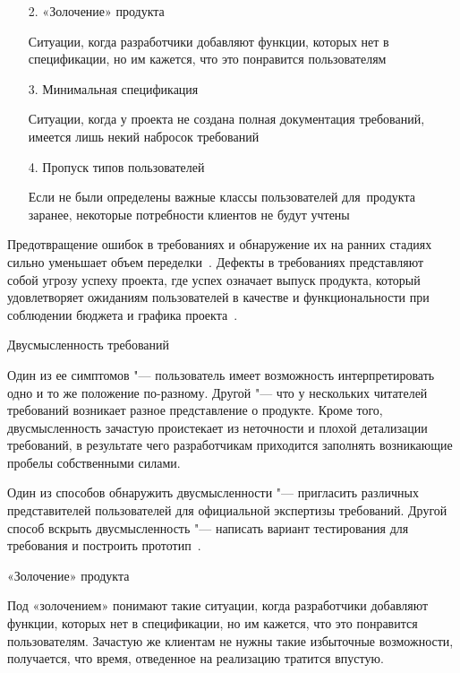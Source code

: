 \documentclass{../industrial-development}
\begin{document}
{\begin{frame}
\begin{itemize}
\item[2.] «Золочение» продукта

{\small Ситуации, когда разработчики добавляют функции, которых нет в спецификации, но им кажется, что это понравится пользователям}

\item[3.] Минимальная спецификация

{\small Ситуации, когда у проекта не создана полная документация требований, имеется лишь некий набросок требований}

\item[4.] Пропуск типов пользователей

{\small Если не были определены важные классы пользователей для~продукта заранее, некоторые потребности клиентов не будут учтены}

\end{itemize}
\end{frame}

\lecturenotes

Предотвращение ошибок в требованиях и обнаружение их на ранних стадиях сильно уменьшает объем переделки~\cite[с.~16]{Wiegers}. Дефекты в требованиях представляют собой угрозу успеху проекта, где успех означает выпуск продукта, который удовлетворяет ожиданиям пользователей в качестве и функциональности при соблюдении бюджета и графика проекта~\cite[с.~17]{Wiegers}.

\alert{Двусмысленность требований}

Один из ее симптомов "--- пользователь имеет возможность интерпретировать одно и то же положение по-разному. Другой "--- что у нескольких читателей требований возникает разное представление о продукте. Кроме того, двусмысленность зачастую проистекает из неточности и плохой детализации требований, в результате чего разработчикам приходится заполнять возникающие пробелы собственными силами.

Один из способов обнаружить двусмысленности "--- пригласить различных представителей пользователей для официальной экспертизы требований. Другой способ вскрыть двусмысленность "--- написать вариант тестирования для требования и построить прототип~\cite[с.~18]{Wiegers}.

\alert{«Золочение» продукта}

Под «золочением» понимают такие ситуации, когда разработчики добавляют функции, которых нет в спецификации, но им кажется, что это понравится пользователям. Зачастую же клиентам не нужны такие избыточные возможности, получается, что время, отведенное на реализацию тратится впустую.

}
\end{document}
